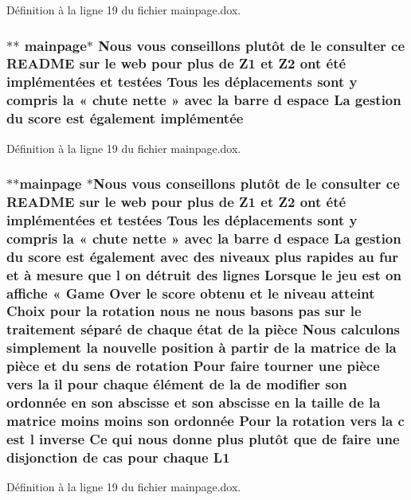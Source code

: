 Définition à la ligne 19 du fichier mainpage.\-dox.

\hypertarget{mainpage_8dox_aa3ef903506925860fe683eb05e33e364}{
\subsubsection[{implémentée}]{\setlength{\rightskip}{0pt plus 5cm}$\ast$$\ast$ mainpage$\ast$ Nous vous conseillons plutô{\bf t} {\bf de} le consulter ce R\-E\-A\-D\-M\-E sur le web pour plus {\bf de} {\bf Z1} et Z2 ont é{\bf t}é implémentées et testées Tous les déplacements sont {\bf y} compris la « chute nette » avec la barre d espace La gestion du score est également implémentée}}\label{mainpage_8dox_aa3ef903506925860fe683eb05e33e364}


Définition à la ligne 19 du fichier mainpage.\-dox.

\hypertarget{mainpage_8dox_a539938753ffc9192d1d78c75df43d627}{
\subsubsection[{L1}]{\setlength{\rightskip}{0pt plus 5cm}$\ast$$\ast$mainpage $\ast$Nous vous conseillons plutô{\bf t} {\bf de} le consulter ce R\-E\-A\-D\-M\-E sur le web pour plus {\bf de} {\bf Z1} et Z2 ont é{\bf t}é implémentées et testées Tous les déplacements sont {\bf y} compris la « chute nette » avec la barre d espace La gestion du score est également avec des niveaux plus rapides au fur et à mesure que l on détruit des lignes Lorsque le jeu est on affiche « Game Over le score obtenu et le niveau atteint Choix pour la rotation nous ne nous basons pas sur le traitement {\bf s}éparé {\bf de} chaque état {\bf de} la pièce Nous calculons simplement la nouvelle position à partir {\bf de} la {\bf matrice} {\bf de} la pièce et du {\bf sens} {\bf de} rotation Pour faire tourner une pièce vers la il pour chaque élément {\bf de} la {\bf de} modifier son ordonnée en son abscisse et son abscisse en la taille {\bf de} la {\bf matrice} moins moins son ordonnée Pour la rotation vers la {\bf c} est l inverse Ce qui nous donne plus plutô{\bf t} que {\bf de} faire une disjonction {\bf de} {\bf cas} pour chaque L1}}\label{mainpage_8dox_a539938753ffc9192d1d78c75df43d627}


Définition à la ligne 19 du fichier mainpage.\-dox.

